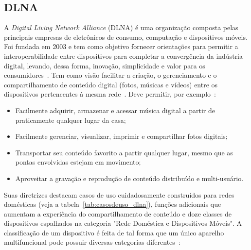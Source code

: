 \subsection{DLNA}

A \emph{Digital Living Network Alliance} (DLNA) é uma organização composta pelas principais empresas de eletrônicos de consumo, computação e dispositivos móveis. Foi fundada em 2003 e tem como objetivo fornecer orientações para permitir a interoperabilidade entre dispositivos para completar a convergência da indústria digital, levando, dessa forma, inovação, simplicidade e valor para os consumidores~\cite{dlnaoverview}. Tem como visão facilitar a criação, o gerenciamento e o compartilhamento de conteúdo digital (fotos, músicas e vídeos) entre os dispositivos pertencentes à mesma rede~\cite{dlnahdvideostreaming}. Deve permitir, por exemplo~\cite{dlnaoverview}:

\begin{itemize}
	\item Facilmente adquirir, armazenar e acessar música digital a partir de praticamente qualquer lugar da casa;
	\item Facilmente gerenciar, visualizar, imprimir e compartilhar fotos digitais;
	\item Transportar seu conteúdo favorito a partir qualquer lugar, mesmo que as pontas envolvidas estejam em movimento;
	\item Aproveitar a gravação e reprodução de conteúdo distribuído e multi-usuário.
\end{itemize}

Suas diretrizes destacam casos de uso cuidadosamente construídos para redes domésticas (veja a tabela~\ref{tab:casosdeuso_dlna}), funções adicionais que aumentam a experiência do compartilhamento de conteúdo e doze classes de dispositivos espalhados na categoria "Rede Doméstica e Dispositivos Móveis". A classificação de um dispositivo é feita de tal forma que um único aparelho multifuncional pode possuir diversas categorias diferentes~\cite{dlnahdvideostreaming, dlnaclasses}:

